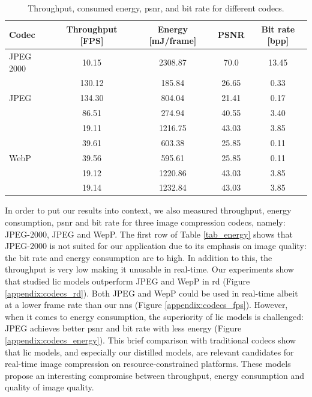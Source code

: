 \documentclass{article}
\begin{document}
\begin{table}[t]
    \centering
    \caption{Throughput, consumed energy, \acrshort{psnr}, and bit rate for different codecs.}
    \label{tab_codecs}
    \setlength{\tabcolsep}{14pt}
    \renewcommand{\arraystretch}{1.2}
    \begin{tabular}{lcccc}
        \toprule
        Codec & Throughput [FPS] & Energy [mJ/frame] & PSNR & Bit rate [bpp] \\
        \midrule
        JPEG 2000 & 10.15 & 2308.87 & 70.0 & 13.45 \\
        \midrule
        \multirow{3}{*}{JPEG}
          & 130.12 & \cellcolor{Good}185.84 & 26.65 & 0.33 \\
          & \cellcolor{Good}134.30 & \cellcolor{Bad}804.04 & \cellcolor{Bad}21.41 & \cellcolor{Good}0.17 \\
          & \cellcolor{Bad}86.51 & 274.94 & \cellcolor{Good}40.55 & \cellcolor{Bad}3.40 \\
        \midrule
        \multirow{5}{*}{WebP}
          & \cellcolor{Bad}19.11 & 1216.75 & 43.03 & 3.85 \\
          & \cellcolor{Good}39.61 & 603.38 & 25.85 & 0.11 \\
          & 39.56 & \cellcolor{Good}595.61 & \cellcolor{Bad}25.85 & \cellcolor{Good}0.11 \\
          & 19.12 & 1220.86 & \cellcolor{Good}43.03 & \cellcolor{Bad}3.85 \\
          & 19.14 & \cellcolor{Bad}1232.84 & 43.03 & 3.85 \\
        \bottomrule
    \end{tabular}
\end{table}

In order to put our results into context, we also measured throughput, energy consumption, \acrshort{psnr} and bit rate for three image compression codecs, namely: JPEG-2000, JPEG and WepP. The first row of Table \ref{tab_energy} shows that JPEG-2000 is not suited for our application due to its emphasis on image quality: the bit rate and energy consumption are to high. In addition to this, the throughput is very low making it unusable in real-time. Our experiments show that studied \acrshort{lic} models outperform JPEG and WepP in \acrshort{rd} (Figure \ref{appendix:codecs_rd}). Both JPEG and WepP could be used in real-time albeit at a lower frame rate than our \acrshort{nn}s (Figure \ref{appendix:codecs_fps}). However, when it comes to energy consumption, the superiority of \acrshort{lic} models is challenged: JPEG achieves better \acrshort{psnr} and bit rate with less energy (Figure \ref{appendix:codecs_energy}). This brief comparison with traditional codecs show that \acrshort{lic} models, and especially our distilled models, are relevant candidates for real-time image compression on resource-constrained platforms. These models propose an interesting compromise between throughput, energy consumption and quality of image quality.
\end{document}
